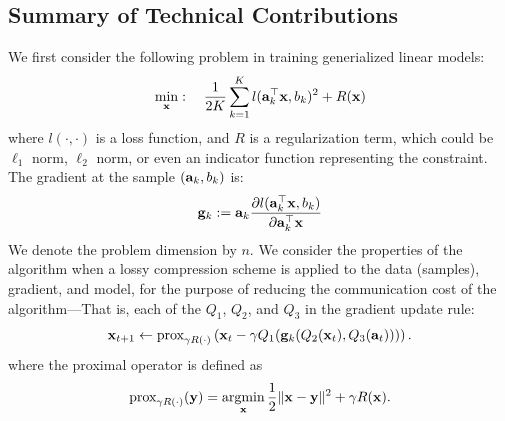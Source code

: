 \documentclass{article}
\renewcommand{\vec}[1]{\mathbf{#1}}
\def\a{{\bf a}}
\def\g{{\bf g}}
\def\x{{\bf x}}
\def\y{{\bf y}}
\DeclareMathOperator*{\argmin}{argmin}
\begin{document}


\subsection*{Summary of Technical Contributions}

We first consider the following problem in training generialized linear models: 
\begin{align}
\min_{\x}:\quad {1\over 2K}\sum_{k=1}^K l(\a_k^\top \x, b_k)^2 + R(\x)
\label{eqn:leastsquares}
\end{align}
where $l(\cdot,\cdot)$ is a loss function, and $R$ is a regularization term, which could be $\ell_1$ norm, $\ell_2$ norm, or even an indicator function representing the constraint. 
The gradient at the sample $(\a_k, b_k)$ is: 
\[
\g_k := \a_k \frac{\partial l(\a_k^\top \x, b_k)}{\partial \a_k^\top \x} 
\]
We denote the problem dimension by $n$. 
We consider the properties of the algorithm when a lossy compression scheme is applied to the data (samples), 
gradient, and model, for the purpose of reducing the communication cost of the algorithm---That is, each of the $Q_1$, $Q_2$, and $Q_3$ in the gradient update rule:
\begin{align}
\x_{t + 1} \leftarrow \text{prox}_{\gamma R(\cdot)}\left(\x_t - \gamma Q_1(\g_k (Q_2(\x_t), Q_3(\vec{a}_t)))\right).
\label{eq:proxupdate}
\end{align}
where the proximal operator is defined as
\[
\text{prox}_{\gamma R(\cdot)}(\y) =\argmin_{\x} {1\over 2}\|\x-\y\|^2 + \gamma R(\x).
\]
\end{document}
